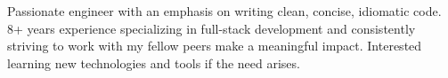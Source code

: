 

\begin{cvparagraph}

Passionate engineer with an emphasis on writing clean, concise, idiomatic code. 8+ years experience specializing in full-stack development and
consistently striving to work with my fellow peers make a meaningful impact. Interested learning new technologies and tools if the need arises.
\end{cvparagraph}
